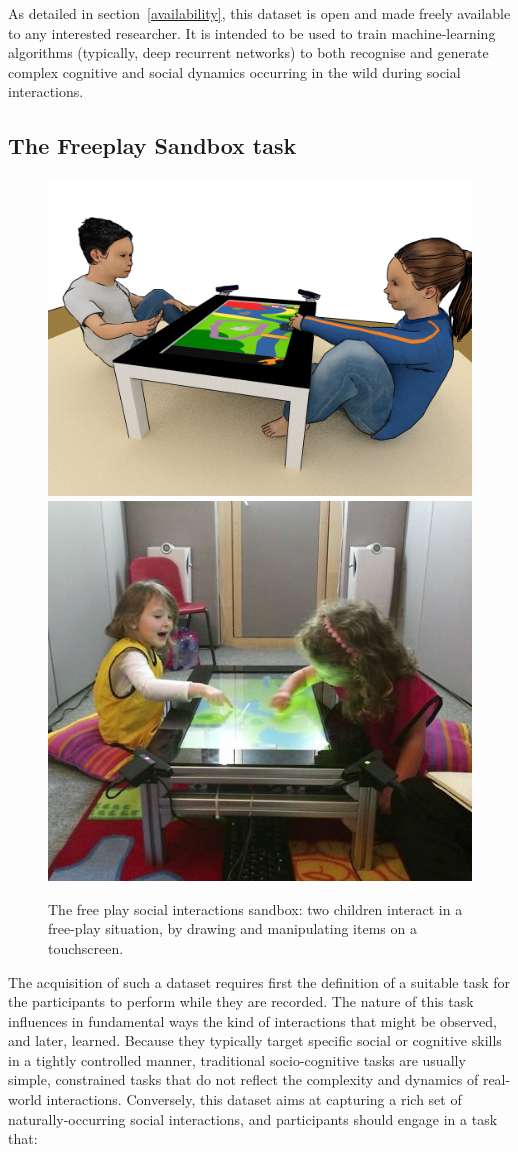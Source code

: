 \documentclass{article}
\begin{document}
As detailed in section~\ref{availability}, this dataset is open and made freely
available to any interested researcher. It is intended to be used to train
machine-learning algorithms (typically, deep recurrent networks) to both
recognise and generate complex cognitive and social dynamics occurring in the
wild during social interactions.

\subsection{The Freeplay Sandbox task}

\begin{figure}
    \centering
    \includegraphics[width=0.55\linewidth]{setup-child-child.png}
    \hspace{1em}
    \includegraphics[width=0.4\linewidth]{child-child-env}
    \caption{The free play social interactions sandbox: two children interact in
    a free-play situation, by drawing and manipulating items on a touchscreen.}
    \label{fig|freeplay}
\end{figure}

The acquisition of such a dataset requires first the definition of a suitable
task for the participants to perform while they are recorded. The nature of
this task influences in fundamental ways the kind of interactions that might be
observed, and later, learned. Because they typically target specific social
or cognitive skills in a tightly controlled manner, traditional socio-cognitive tasks are
usually simple, constrained tasks that do not reflect the complexity and dynamics of
real-world interactions. Conversely, this dataset aims at capturing a rich set
of naturally-occurring social interactions, and participants should engage in a task that:
\end{document}
